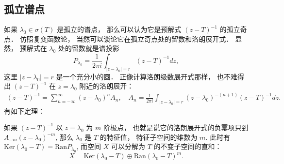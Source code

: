 \subsection{孤立谱点}
如果 $\lambda_0\in\sigma(T)$ 是孤立的谱点， 那么可以认为它是预解式 $(z-T)^{-1}$ 的孤立奇点． 仿照复变函数论， 当然可以谈论它在孤立奇点处的留数和洛朗展开式． 显然， 预解式在 $\lambda_0$ 处的留数就是谱投影
$$
P_{\lambda_0}=\frac{1}{2\pi i}\int_{|z-\lambda_0|=r}(z-T)^{-1}dz,
$$
这里 $|z-\lambda_0|=r$ 是一个充分小的圆． 正像计算洛朗级数展开式那样， 也不难得出 $(z-T)^{-1}$ 在 $z=\lambda_0$ 附近的洛朗展开：
$$
\begin{aligned}
(z-T)^{-1}
=\sum_{n=-\infty}^\infty(z-\lambda_0)^nA_n,
\quad
A_n=\frac{1}{2\pi i}\int_{|z-\lambda_0|=r}(z-\lambda_0)^{-(n+1)}(z-T)^{-1}dz.
\end{aligned}
$$
有如下定理：
\begin{theorem}{}
如果 $(z-T)^{-1}$ 以 $z=\lambda_0$ 为 $m$ 阶极点， 也就是说它的洛朗展开式的负幂项只到 $A_{-m}(z-\lambda_0)^{-m}$, 那么 $\lambda_0$ 是 $T$ 的特征值， 特征子空间的维数为 $m$. 此时有 $\text{Ker}(\lambda_0-T)=\text{Ran}P_{\lambda_0}$, 而空间 $X$ 可以分解为 $T$ 的不变子空间的直和：
$$
X=\text{Ker}(\lambda_0-T)\oplus \text{Ran}(\lambda_0-T)^m.
$$
\end{theorem}